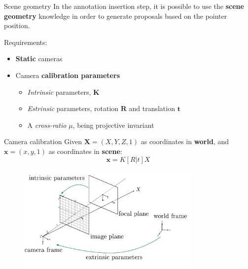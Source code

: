 \documentclass{beamer}
\begin{document}
\begin{tframe}{Scene geometry}
In the annotation insertion step, it is possible to use the\textbf{ scene geometry} knowledge in order to generate proposals based on the pointer position.

\vspace{0.5cm}
Requirements:
\vspace{0.3cm}
\begin{itemize}
\item \textbf{Static} cameras
\vspace{0.2cm}
\item Camera \textbf{calibration parameters}
\vspace{0.2cm}
\begin{itemize}
\item \emph{Intrinsic} parameters, $\textbf{K}$
\item \emph{Estrinsic} parameters, rotation $\textbf{R}$ and translation $\textbf{t}$
\item A \emph{cross-ratio} \textbf{$\mu$}, being projective invariant
\end{itemize}
\end{itemize}
\end{tframe}

\begin{tframe}{Camera calibration}
Given $\textbf{X} = (X, Y, Z, 1)$ as coordinates in \textbf{world}, and $\textbf{x} = (x, y, 1)$ as coordinates in \textbf{scene}:
$$\textbf{x} = K [R | t] X$$
\begin{figure}[h]
\centering
\includegraphics[width=0.8\textwidth]{images/camera.jpg}
\end{figure}
\end{tframe}
\end{document}
